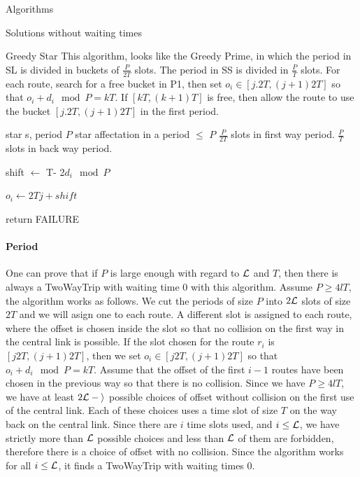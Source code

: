 \documentclass[a4paper,10pt]{report}
\begin{document}
\begin{chapter}{Algorithms}
\begin{section}{Solutions without waiting times}
\begin{subsection}{Greedy Star}
This algorithm, looks like the Greedy Prime, in which the period in SL is divided in buckets of $\frac{P}{2T}$ slots. The period in SS is divided in $\frac{P}{T}$ slots.
For each route, search for a free bucket in P1, then set $o_i \in [j.2T,(j+1)2T]$ so that $o_i + d_i \mod P = kT$.
If $[kT,(k+1)T]$ is free, then allow the route to use the bucket $[j.2T,(j+1)2T]$ in the first period.\\



\begin{algorithm}[H]
\caption{Greedy Star assignment algorithm}
\begin{algorithmic}
\REQUIRE star s, period $P$
\ENSURE star affectation in a period $\leq $ $P$ 
\STATE $\frac{P}{2T}$ slots in first way period.
\STATE $\frac{P}{T}$ slots in back way period.



\STATE shift $\leftarrow$ T- 2$d_i \mod P$ 


\STATE $o_i \leftarrow 2Tj + shift$
\ENDIF

\ENDIF

\STATE return FAILURE
\ENDIF
\ENDFOR

\ENDFOR

\end{algorithmic}
\end{algorithm}


\paragraph{Period}
One can prove that if $P$ is large enough with regard to $\cal{L}$ and $T$, then there is always a TwoWayTrip
with waiting time $0$ with this algorithm.
 Assume $P \geq 4lT$, the algorithm works as follows. 
We cut the periods of size $P$ into $2\cal{L}$ slots of size $2T$ and we will asign one to each route.
A different slot is assigned to each route, where the offset is chosen inside the slot so that 
no collision on the first way in the central link is possible. If the slot chosen for the route $r_i$ is $[j2T,(j+1)2T]$,
then we set $o_i \in [j2T,(j+1)2T]$ so that $o_i + d_i \mod P = kT$. Assume that the offset of the first $i-1$ routes have been 
chosen in the previous way so that there is no collision. Since we have $P \geq 4lT$, we have at least $2\cal{L}-i$ possible choices of offset without collision on the first use of the central link. Each of these choices uses a time slot of size $T$ on the way back on the central link. Since there are $i$ time slots used, and $i \leq \cal{L}$, we have strictly more than $\cal{L}$ possible choices and less than $\cal{L}$ of them are forbidden, therefore there is a choice of offset with no collision. 
Since the algorithm works for all $i \leq \cal{L}$, it finds a TwoWayTrip with waiting times $0$. 


\end{subsection}
\end{section}
\end{chapter}
\end{document}
